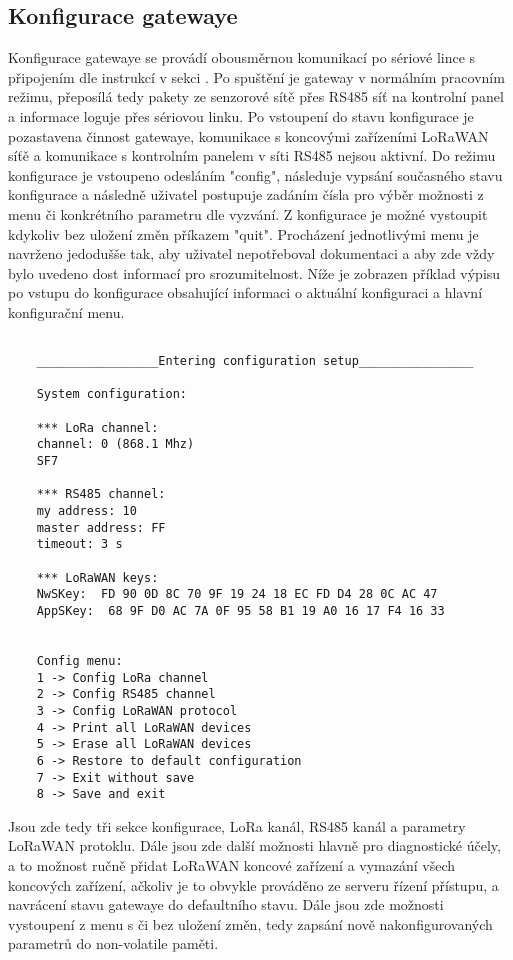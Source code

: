 \subsection{Konfigurace gatewaye}
\label{Konfigurace gatewaye}
Konfigurace gatewaye se provádí obousměrnou komunikací po sériové lince s připojením dle instrukcí v sekci .
Po spuštění je gateway v normálním pracovním režimu, přeposílá tedy pakety ze senzorové sítě přes RS485 síť na kontrolní panel a informace loguje přes sériovou linku.
Po vstoupení do stavu konfigurace je pozastavena činnost gatewaye, komunikace s koncovými zařízeními LoRaWAN síťě a komunikace s kontrolním panelem v síti RS485 nejsou aktivní.
Do režimu konfigurace je vstoupeno odesláním "config", následuje vypsání současného stavu konfigurace a následně uživatel postupuje zadáním čísla pro výběr možnosti z menu či konkrétního parametru dle vyzvání. Z konfigurace je možné vystoupit kdykoliv bez uložení změn příkazem "quit". 
Procházení jednotlivými menu je navrženo jedodušše tak, aby uživatel nepotřeboval dokumentaci a aby zde vždy bylo uvedeno dost informací pro srozumitelnost.
Níže je zobrazen příklad výpisu po vstupu do konfigurace obsahující informaci o aktuální konfiguraci a hlavní konfigurační menu.

\begin{lstlisting}[style=log]

    _________________Entering configuration setup________________
    
    System configuration:
    
    *** LoRa channel: 
    channel: 0 (868.1 Mhz)
    SF7
    
    *** RS485 channel: 
    my address: 10
    master address: FF
    timeout: 3 s
    
    *** LoRaWAN keys: 
    NwSKey:  FD 90 0D 8C 70 9F 19 24 18 EC FD D4 28 0C AC 47
    AppSKey:  68 9F D0 AC 7A 0F 95 58 B1 19 A0 16 17 F4 16 33
    
    
    Config menu:
    1 -> Config LoRa channel
    2 -> Config RS485 channel
    3 -> Config LoRaWAN protocol
    4 -> Print all LoRaWAN devices
    5 -> Erase all LoRaWAN devices
    6 -> Restore to default configuration
    7 -> Exit without save
    8 -> Save and exit

\end{lstlisting}
    

Jsou zde tedy tři sekce konfigurace, LoRa kanál, RS485 kanál a parametry LoRaWAN protoklu.
Dále jsou zde další možnosti hlavně pro diagnostické účely, a to možnost ručně přidat LoRaWAN koncové zařízení a vymazání všech koncových zařízení, ačkoliv je to obvykle prováděno ze serveru řízení přístupu, a navrácení stavu gatewaye do defaultního stavu. Dále jsou zde možnosti vystoupení z menu s či bez uložení změn, tedy zapsání nově nakonfigurovaných parametrů do non-volatile paměti.

